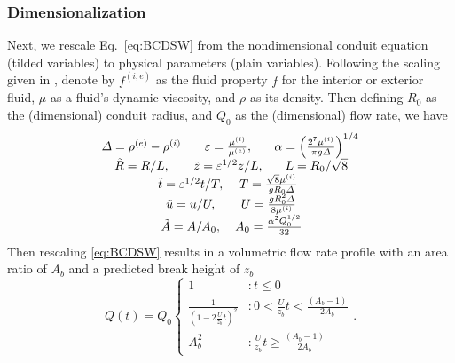 \documentclass{jfm}
\newcommand{\eps}{\varepsilon}
\newcommand{\ifl}{^{(i)}}
\newcommand{\efl}{^{(e)}}
\begin{document}
\subsubsection{Dimensionalization}\label{sec:Dimensionalization}
Next, we rescale Eq.~\ref{eq:BCDSW} from the nondimensional conduit equation (tilded variables) to physical parameters (plain variables). 
Following the scaling given in \cite{lowman_dispersive_2013}, denote by $f^{(i,e)}$ as the fluid property $f$ for the interior or exterior fluid, $\mu$ as a fluid's dynamic viscosity, and $\rho$ as its density. Then defining $R_0$ as the (dimensional) conduit radius, and $Q_0$ as the (dimensional) flow rate, we have
\begin{equation}
\begin{split}
    \begin{array}{ccc}
        \Delta = \rho\efl-\rho\ifl       & \eps = \frac{\mu\ifl}{\mu\efl}, & \alpha = \left(\frac{2^7\mu\ifl}{\pi g \Delta}\right)^{1/4} \\
        \tilde{R} = R/L, & \tilde{z} = \eps^{1/2}z/L,       & L = R_0/\sqrt{8} \\
    \multicolumn{3}{c}
    { 
        \begin{array}{cc}
            \tilde{t} = \eps^{1/2}t/T,                 & T = \frac{\sqrt{8}\mu\ifl}{g R_0 \Delta} \\
            \tilde{u} = u/U,                 & U = \frac{g R_0^2 \Delta}{8 \mu\ifl} \\
            \tilde{A} = A/A_0,               & A_0 = \frac{\alpha^2 Q_0^{1/2}}{32} \\
        \end{array}
    }
    \end{array}
    \end{split}
\end{equation}
Then rescaling \ref{eq:BCDSW} results in a volumetric flow rate profile with an area ratio of $A_b$ and a predicted break height of $z_b$
\begin{equation}\label{eq:FlowRateProfile}
   Q(t) = Q_0
     \begin{cases}
       1                    & :                        t \le 0                          \\
       \frac{1}{(1-2\frac{U}{z_b}t)^2}  & :  0 < \frac{U}{z_b}t < \frac{(A_b - 1)}{2A_b}          \\
       A_b^2                  & :        \frac{U}{z_b}t \ge  \frac{(A_b - 1)}{2A_b}
     \end{cases}.
\end{equation}
\end{document}
